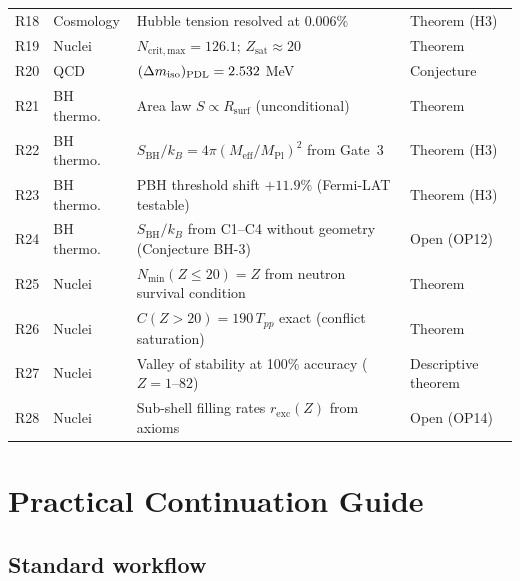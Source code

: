 \documentclass[11pt,a4paper]{article}
\theoremstyle{plain}
\theoremstyle{definition}
\theoremstyle{remark}
\newcommand{\PDL}{\textnormal{PDL}}
\newcommand{\Rsurf}{R_{\mathrm{surf}}}
\newcommand{\SBH}{S_{\mathrm{BH}}}
\newcommand{\Meff}{M_{\mathrm{eff}}}
\newcommand{\MPl}{M_{\mathrm{Pl}}}
\newcommand{\Tpp}{T_{pp}}
\newcommand{\Nmin}{N_{\min}}
\begin{document}
\begin{longtable}{@{}L{0.7cm}L{2.5cm}L{6.5cm}L{2.5cm}@{}}
R18 & Cosmology & Hubble tension resolved at $0.006\%$ & \textcolor{proofblue}{Theorem (H3)} \\[0.3em]
R19 & Nuclei & $N_{\mathrm{crit,max}}=126.1$; $Z_{\mathrm{sat}}\approx 20$ & \textcolor{proofblue}{Theorem} \\[0.3em]
R20 & QCD & $(\Delta m_{\mathrm{iso}})_{\PDL}=2.532$ MeV & \textcolor{conjecturegreen}{Conjecture} \\[0.3em]
R21 & BH thermo. & Area law $S\propto\Rsurf$ (unconditional) & \textcolor{proofblue}{Theorem} \\[0.3em]
R22 & BH thermo. & $\SBH/k_B=4\pi(\Meff/\MPl)^2$ from Gate~3 & \textcolor{proofblue}{Theorem (H3)} \\[0.3em]
R23 & BH thermo. & PBH threshold shift $+11.9\%$ (Fermi-LAT testable) & \textcolor{proofblue}{Theorem (H3)} \\[0.3em]
R24 & BH thermo. & $\SBH/k_B$ from C1--C4 without geometry (Conjecture BH-3) & \textcolor{openproblemred}{Open (OP12)} \\[0.3em]
R25 & Nuclei & $\Nmin(Z\leq20)=Z$ from neutron survival condition & \textcolor{proofblue}{Theorem} \\[0.3em]
R26 & Nuclei & $C(Z>20)=190\,\Tpp$ exact (conflict saturation) & \textcolor{proofblue}{Theorem} \\[0.3em]
R27 & Nuclei & Valley of stability at 100\% accuracy ($Z=1$--$82$) & \textcolor{proofblue}{Descriptive theorem} \\[0.3em]
R28 & Nuclei & Sub-shell filling rates $r_{\mathrm{exc}}(Z)$ from axioms & \textcolor{openproblemred}{Open (OP14)} \\[0.3em]

\end{longtable}

\section{Practical Continuation Guide}
\label{sec:continuation}

\subsection{Standard workflow}
\label{subsec:workflow}
\end{document}
